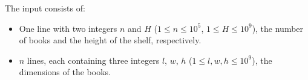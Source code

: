 
    The input consists of:
    \begin{itemize}
        \item One line with two integers $n$ and $H$ ($1\leq n\leq 10^5$, $1\leq H \leq 10^9$), the number of books and the height of the shelf, respectively.
        \item $n$ lines, each containing three integers $l$, $w$, $h$ ($1\leq l,w,h \leq 10^9$), the dimensions of the books.
    \end{itemize}
